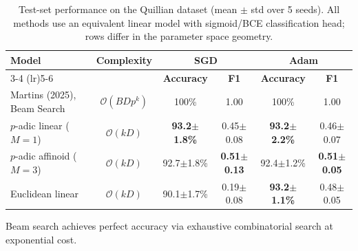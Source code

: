 \begin{table}[h]
\centering
\small
\begin{threeparttable}
\caption{Test-set performance on the Quillian dataset (mean $\pm$ std over 5 seeds).
All methods use an equivalent linear model with sigmoid/BCE classification head;
rows differ in the parameter space geometry.}
\label{tab:quillian_results}
\begin{tabular}{l c c c c c}
\toprule
\textbf{Model} & \textbf{Complexity} & \multicolumn{2}{c}{\textbf{SGD}} & \multicolumn{2}{c}{\textbf{Adam}} \\
\cmidrule(lr){3-4} \cmidrule(lr){5-6}
& & \textbf{Accuracy} & \textbf{F1} & \textbf{Accuracy} & \textbf{F1} \\
\midrule
Martins (2025), Beam Search\tnote{a} & $\mathcal{O}(BDp^k)$ & 100\% & 1.00 & 100\% & 1.00 \\
\midrule
\addlinespace[2pt]
$p$-adic linear ($M\!=\!1$) & $\mathcal{O}(kD)$ & \textbf{93.2$\pm$1.8\%} & 0.45$\pm$0.08 & \textbf{93.2$\pm$2.2\%} & 0.46$\pm$0.07 \\
$p$-adic affinoid ($M\!=\!3$) & $\mathcal{O}(kD)$ & 92.7$\pm$1.8\% & \textbf{0.51$\pm$0.13} & 92.4$\pm$1.2\% & \textbf{0.51$\pm$0.05} \\
Euclidean linear & $\mathcal{O}(kD)$ & 90.1$\pm$1.7\% & 0.19$\pm$0.08 & \textbf{93.2$\pm$1.1\%} & 0.48$\pm$0.05 \\
\bottomrule
\end{tabular}
\begin{tablenotes}
\footnotesize
\item[a] Beam search achieves perfect accuracy via exhaustive combinatorial search at exponential cost.
\end{tablenotes}
\end{threeparttable}
\vspace{-10pt}
\end{table}
